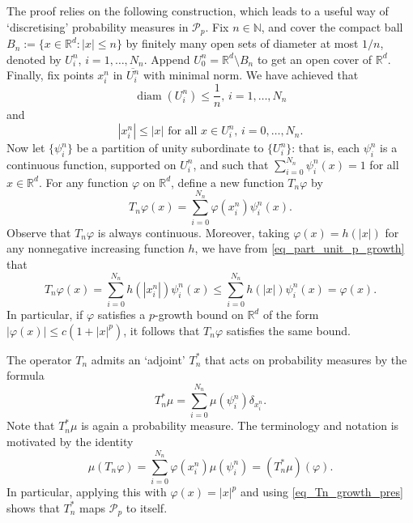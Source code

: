 \documentclass{article}
\theoremstyle{definition}
\numberwithin{equation}{section}
\numberwithin{theorem}{section}
\newcommand{\R}{\mathbb{R}}
\newcommand{\N}{{\mathbb N}}
\newcommand{\Pcal}{{\mathcal P}}
\DeclareMathOperator{\diam}{diam}
\begin{document}
The proof relies on the following construction, which leads to a useful way of `discretising' probability measures in $\Pcal_p$. Fix $n\in \N$, and cover the compact ball  $B_n:=\{x\in {\R^d}\colon |x|\leq n\}$ by finitely many open sets of diameter at most $1/n$, denoted by $U^n_i$, $i=1,\ldots,N_n$. Append $U^n_0={\R^d}\setminus B_n$ to get an open cover of ${\R^d}$. Finally, fix points $x^n_i$ in $\overline{U^n_i}$ with minimal norm. We have achieved that
\begin{equation}\label{eq_part_unit_diam}
\text{$\diam(U^n_i) \le \frac1n$, $i=1,\ldots,N_n$}
\end{equation}
and
\begin{equation}\label{eq_part_unit_p_growth}
\text{$|x^n_i| \le |x|$ for all $x\in U^n_i$, $i=0,\ldots,N_n$.}
\end{equation}
Now let $\{\psi^n_i\}$ be a partition of unity subordinate to $\{U^n_i\}$: that is, each $\psi_i^n$ is a continuous function, supported on $U_i^n$, and such that $\sum_{i=0}^{N_n} \psi_i^n(x) = 1$ for all $x \in {\R^d}$. For any function $\varphi$ on $\R^d$, define a new function $T_n\varphi$ by
\[
T_n\varphi(x) = \sum_{i=0}^{N_n} \varphi(x^n_i)\psi^n_i(x).
\]
Observe that $T_n\varphi$ is always continuous. Moreover, taking $\varphi(x)=h(|x|)$ for any nonnegative increasing function $h$, we have from \eqref{eq_part_unit_p_growth} that
\begin{equation}\label{eq_Tn_growth_pres}
T_n\varphi(x) = \sum_{i=0}^{N_n} h(|x^n_i|) \psi^n_i(x) \le \sum_{i=0}^{N_n} h(|x|) \psi^n_i(x) = \varphi(x).
\end{equation}
In particular, if $\varphi$ satisfies a $p$-growth bound on ${\R^d}$ of the form $|\varphi(x)|\le c(1+|x|^p)$, it follows that $T_n\varphi$ satisfies the same bound.


The operator $T_n$ admits an `adjoint' $T_n^*$ that acts on probability measures by the formula
\[
T_n^*\mu = \sum_{i=0}^{N_n} \mu(\psi^n_i) \delta_{x^n_i}.
\]
Note that $T_n^*\mu$ is again a probability measure. The terminology and notation is motivated by the identity
\begin{equation}\label{eq_Tn_adjoint}
\mu(T_n\varphi) = \sum_{i=0}^{N_n}\varphi(x^n_i) \mu(\psi^n_i) = (T_n^*\mu)(\varphi).
\end{equation}
In particular, applying this with $\varphi(x)=|x|^p$ and using \eqref{eq_Tn_growth_pres} shows that $T_n^*$ maps $\Pcal_p$ to itself.
\end{document}
